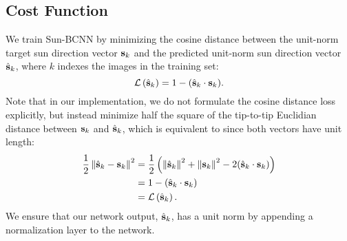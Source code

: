 \subsection{Cost Function}
We train Sun-BCNN by minimizing the cosine distance between the unit-norm target sun direction vector $\boldsymbol{\mathbf{s}}_k$  and the predicted unit-norm sun direction vector $\hat{\boldsymbol{\mathbf{s}}}_k$, where $k$ indexes the images in the training set:
\begin{equation}
	\mathcal{L}\left(\hat{\boldsymbol{\mathbf{s}}}_k\right) = 1 - (\hat{\boldsymbol{\mathbf{s}}}_k \cdot \boldsymbol{\mathbf{s}}_k).
	\label{eq:cnn_loss}
\end{equation}
Note that in our implementation, we do not formulate the cosine distance loss explicitly, but instead minimize half the square of the tip-to-tip Euclidian distance between $\boldsymbol{\mathbf{s}}_k$ and $\hat{\boldsymbol{\mathbf{s}}}_k$, which is equivalent to  since both vectors have unit length:
\begin{align*}
 	\frac{1}{2} \left\Vert\hat{\boldsymbol{\mathbf{s}}}_k  - \boldsymbol{\mathbf{s}}_k\right\Vert^2 &= \frac{1}{2} \left( \left\Vert\hat{\boldsymbol{\mathbf{s}}}_k\right\Vert^2 + \left\Vert\boldsymbol{\mathbf{s}}_k\right\Vert^2 - 2 (\hat{\boldsymbol{\mathbf{s}}}_k \cdot \boldsymbol{\mathbf{s}}_k) \right) \\
 		&= 1 - (\hat{\boldsymbol{\mathbf{s}}}_k \cdot \boldsymbol{\mathbf{s}}_k) \\
 		&= \mathcal{L}\left(\hat{\boldsymbol{\mathbf{s}}}_k\right).
\end{align*}
We ensure that our network output, $\hat{\boldsymbol{\mathbf{s}}}_k$, has a unit norm by appending a normalization layer to the network.

